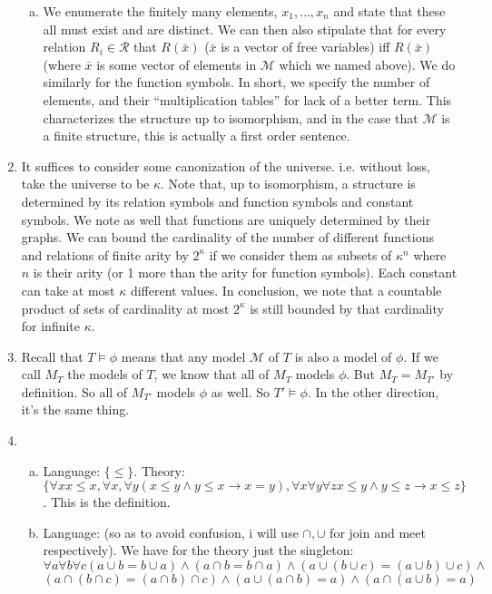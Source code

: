 \documentclass[10pt]{article}
\newcommand{\A}{\forall}
\begin{document}
\begin{enumerate}[1.]
\begin{enumerate}[a)]
	\item We enumerate the finitely many elements, $x_1, \ldots, x_n$ and state that these all must exist and are distinct. We can then also stipulate that for every relation $R_i \in \mathcal{R}$ that $R(\bar{x})$ ($\bar{x}$ is a vector of free variables) iff $R(\bar{x})$ (where $\bar{x}$ is some vector of elements in $\mathcal{M}$ which we named above). We do similarly for the function symbols. In short, we specify the number of elements, and their ``multiplication tables'' for lack of a better term. This characterizes the structure up to isomorphism, and in the case that $\mathcal{M}$ is a finite structure, this is actually a first order sentence. 
	
	\end{enumerate}

\item It suffices to consider some canonization of the universe. i.e. without loss, take the universe to be $\kappa$. Note that, up to isomorphism, a structure is determined by its relation symbols and function symbols and constant symbols. We note as well that functions are uniquely determined by their graphs. We can bound the cardinality of the number of different functions and relations of finite arity by $2^\kappa$ if we consider them as subsets of $\kappa^n$ where $n$ is their arity (or 1 more than the arity for function symbols). Each constant can take at most $\kappa$ different values. In conclusion, we note that a countable product of sets of cardinality at most $2^\kappa$ is still bounded by that cardinality for infinite $\kappa$. 

\item Recall that $T \models \phi$ means that any model $\mathcal{M}$ of $T$ is also a model of $\phi$. If we call $M_T$ the models of $T$, we know that all of $M_T$ models $\phi$. But $M_T = M_{T'}$ by definition. So all of $M_{T'}$ models $\phi$ as well. So $T' \models \phi$. In the other direction, it's the same thing. 

\item 

	\begin{enumerate}[a)]
	
	\item Language: $\{\leq\}$. Theory: $\{\A x x \leq x, \A x, \A y ( x \leq y \land y \leq x \to x = y), \A x\A y\A z x \leq y \land y \leq z \to x \leq z\}$. This is the definition. 
	
	\item Language: (so as to avoid confusion, i will use $\cap, \cup$ for join and meet respectively). We have for the theory just the singleton: \[\A a \A b \A c (a \cup b = b \cup a) \land (a \cap b = b \cap a) \land (a \cup (b \cup c) = (a \cup b) \cup c) \land \]\[(a \cap (b \cap c) = (a \cap b) \cap c) \land (a \cup (a \cap b) = a) \land (a \cap (a \cup b) = a)\]
	

\end{enumerate}
\end{enumerate}
\end{document}
